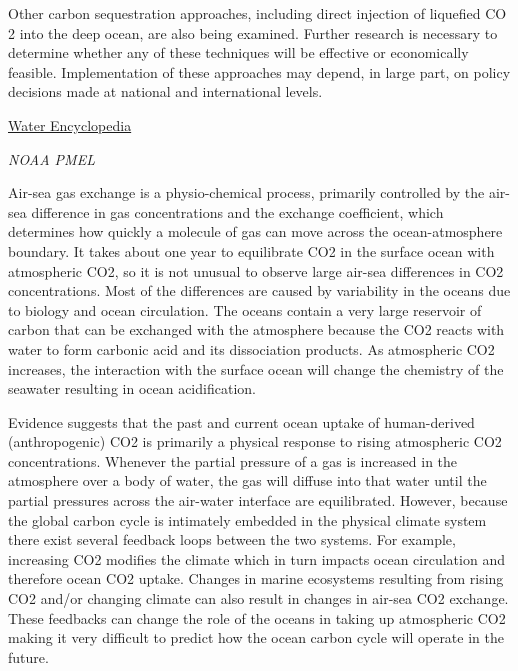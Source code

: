 \documentclass[
]{book}
\begin{document}
Other carbon sequestration approaches, including direct injection of liquefied CO 2 into the deep ocean, are also being examined. Further research is necessary to determine whether any of these techniques will be effective or economically feasible. Implementation of these approaches may depend, in large part, on policy decisions made at national and international levels.

\href{http://www.waterencyclopedia.com/Bi-Ca/Carbon-Dioxide-in-the-Ocean-and-Atmosphere.html}{Water Encyclopedia}

\emph{NOAA PMEL}

Air-sea gas exchange is a physio-chemical process, primarily controlled by the air-sea difference in gas concentrations and the exchange coefficient, which determines how quickly a molecule of gas can move across the ocean-atmosphere boundary. It takes about one year to equilibrate CO2 in the surface ocean with atmospheric CO2, so it is not unusual to observe large air-sea differences in CO2 concentrations. Most of the differences are caused by variability in the oceans due to biology and ocean circulation. The oceans contain a very large reservoir of carbon that can be exchanged with the atmosphere because the CO2 reacts with water to form carbonic acid and its dissociation products. As atmospheric CO2 increases, the interaction with the surface ocean will change the chemistry of the seawater resulting in ocean acidification.

Evidence suggests that the past and current ocean uptake of human-derived (anthropogenic) CO2 is primarily a physical response to rising atmospheric CO2 concentrations. Whenever the partial pressure of a gas is increased in the atmosphere over a body of water, the gas will diffuse into that water until the partial pressures across the air-water interface are equilibrated. However, because the global carbon cycle is intimately embedded in the physical climate system there exist several feedback loops between the two systems. For example, increasing CO2 modifies the climate which in turn impacts ocean circulation and therefore ocean CO2 uptake. Changes in marine ecosystems resulting from rising CO2 and/or changing climate can also result in changes in air-sea CO2 exchange. These feedbacks can change the role of the oceans in taking up atmospheric CO2 making it very difficult to predict how the ocean carbon cycle will operate in the future.
\end{document}
